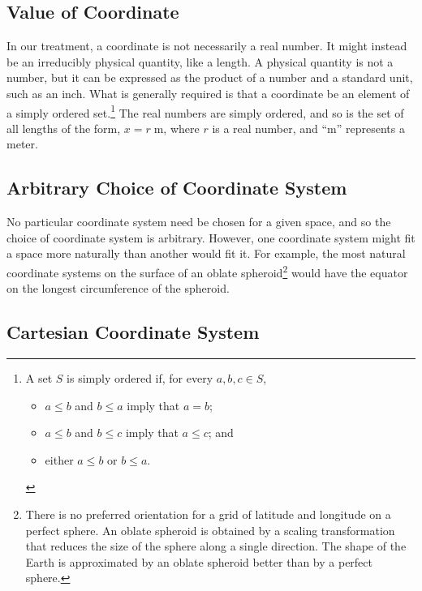 \subsection{Value of Coordinate}

In our treatment, a coordinate is not necessarily a real number.  It might
instead be an irreducibly physical quantity, like a length.  A physical
quantity is not a number, but it can be expressed as the product of a number
and a standard unit, such as an inch.  What is generally required is that a
coordinate be an element of a simply ordered set.\footnote{%
   A set $S$ is simply ordered if, for every $a, b, c \in S$,
   \begin{itemize}[noitemsep]
      \item $a \leq b$ and $b \leq a$ imply that $a = b$;
      \item $a \leq b$ and $b \leq c$ imply that $a \leq c$; and
      \item either $a \leq b$ or $b \leq a$.
   \end{itemize}%
}
The real numbers are simply ordered, and so is the set of all lengths of the
form, $x = r \; \text{m}$, where $r$ is a real number, and ``$\text{m}$''
represents a meter.

\subsection{Arbitrary Choice of Coordinate System}

No particular coordinate system need be chosen for a given space, and so the
choice of coordinate system is arbitrary.  However, one coordinate system might
fit a space more naturally than another would fit it.  For example, the most
natural coordinate systems on the surface of an oblate
spheroid\footnote{%
   There is no preferred orientation for a grid of latitude and longitude on a
   perfect sphere.  An oblate spheroid is obtained by a scaling transformation
   that reduces the size of the sphere along a single direction.  The shape of
   the Earth is approximated by an oblate spheroid better than by a perfect
   sphere.%
}
would have the equator on the longest circumference of the spheroid.

\subsection{Cartesian Coordinate System}

